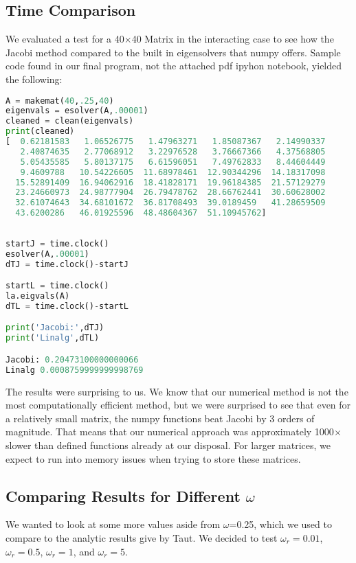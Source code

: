 \documentclass{article}
\begin{document}
\subsection{Time Comparison}
We evaluated a test for a 40$\times$40 Matrix in the interacting case to see how the Jacobi method compared to the built in eigensolvers that numpy offers. Sample code found in our final program, not the attached pdf ipyhon notebook, yielded the following:
\begin{lstlisting}[language=Python]
A = makemat(40,.25,40)
eigenvals = esolver(A,.00001)
cleaned = clean(eigenvals)
print(cleaned)
[  0.62181583   1.06526775   1.47963271   1.85087367   2.14990337
   2.40874635   2.77068912   3.22976528   3.76667366   4.37568805
   5.05435585   5.80137175   6.61596051   7.49762833   8.44604449
   9.4609788   10.54226605  11.68978461  12.90344296  14.18317098
  15.52891409  16.94062916  18.41828171  19.96184385  21.57129279
  23.24660973  24.98777904  26.79478762  28.66762441  30.60628002
  32.61074643  34.68101672  36.81708493  39.0189459   41.28659509
  43.6200286   46.01925596  48.48604367  51.10945762]
  
  
startJ = time.clock()
esolver(A,.00001)
dTJ = time.clock()-startJ

startL = time.clock()
la.eigvals(A)
dTL = time.clock()-startL

print('Jacobi:',dTJ)
print('Linalg',dTL)

Jacobi: 0.20473100000000066
Linalg 0.0008759999999998769
\end{lstlisting}
The results were surprising to us. We know that our numerical method is not the most computationally efficient method, but we were surprised to see that even for a relatively small matrix, the numpy functions beat Jacobi by 3 orders of magnitude. That means that our numerical approach was approximately 1000$\times$ slower than defined functions already at our disposal. For larger matrices, we expect to run into memory issues when trying to store these matrices.
\\

\subsection{Comparing Results for Different $\omega$}
We wanted to look at some more values aside from $\omega$=0.25, which we used to compare to the analytic results give by Taut. We decided to test $\omega_r = 0.01$, $\omega_r = 0.5$, $\omega_r =1$, and $\omega_r = 5$.
\end{document}

